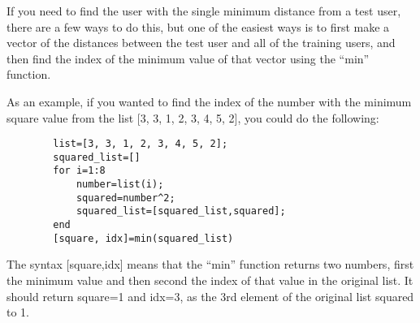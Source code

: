 \documentclass{ximera}
\begin{document}
\begin{exploration}
\begin{problem}
    \begin{hint}

      If you need to find the user with the single minimum distance from a test user, there are a few ways to do this, but one of the easiest ways is to first make a vector of the distances between the test user and all of the training users, and then find the index of the minimum value of that vector using the ``min'' function.

      As an example, if you wanted to find the index of the number with the minimum square value from the list [3, 3, 1, 2, 3, 4, 5, 2], you could do the following:
      \begin{verbatim}
        list=[3, 3, 1, 2, 3, 4, 5, 2];
        squared_list=[]
        for i=1:8
            number=list(i);
            squared=number^2;
            squared_list=[squared_list,squared];
        end
        [square, idx]=min(squared_list)
      \end{verbatim}

      The syntax [square,idx] means that the ``min'' function returns two numbers, first the minimum value and then second the index of that value in the original list. It should return square=1 and idx=3, as the 3rd element of the original list squared to 1.

    \end{hint}
  \end{problem}
  \end{exploration}
\end{document}
